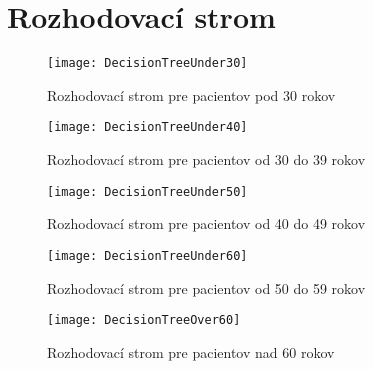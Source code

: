 \section{Rozhodovací strom}
\label{app:rozhodovaci-strom}

\begin{figure}[h!]
	\centering
  		\texttt{[image: DecisionTreeUnder30]}
  	\caption{Rozhodovací strom pre pacientov pod 30 rokov}
  	\label{fig:under30}
\end{figure}

\begin{figure}[h!]
	\centering
  		\texttt{[image: DecisionTreeUnder40]}
  	\caption{Rozhodovací strom pre pacientov od 30 do 39 rokov}
  	\label{fig:under40}
\end{figure}

\begin{figure}[h!]
	\centering
  		\texttt{[image: DecisionTreeUnder50]}
  	\caption{Rozhodovací strom pre pacientov od 40 do 49 rokov}
  	\label{fig:under50}
\end{figure}

\begin{figure}[h!]
	\centering
  		\texttt{[image: DecisionTreeUnder60]}
  	\caption{Rozhodovací strom pre pacientov od 50 do 59 rokov}
  	\label{fig:under60}
\end{figure}

\begin{figure}[h!]
	\centering
  		\texttt{[image: DecisionTreeOver60]}
  	\caption{Rozhodovací strom pre pacientov nad 60 rokov}
  	\label{fig:over60}
\end{figure}